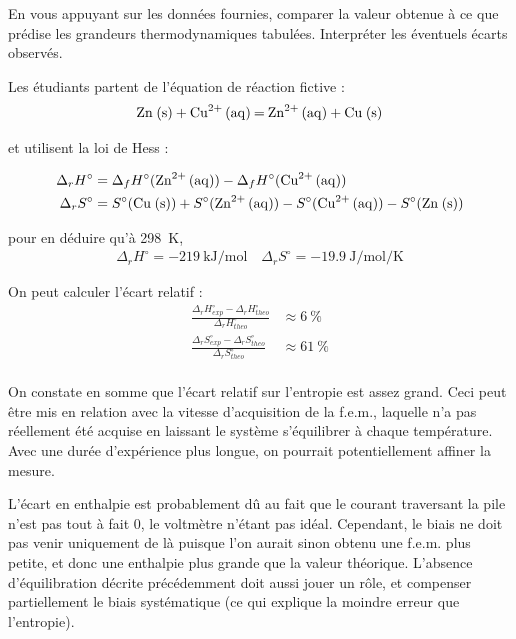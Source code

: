 \documentclass[twoside,a4paper,11pt,addpoints]{exam}%
\newcounter{foo} %
\begin{document}
\begin{questions}
\begin{mybox}
\bonusquestion[1] En vous appuyant sur les données fournies, comparer la valeur obtenue à ce que prédise les grandeurs thermodynamiques tabulées. Interpréter les éventuels écarts observés.


\begin{solution}[8cm]
Les étudiants partent de l'équation de réaction fictive : 
\begin{align*}
\ce{Zn (s) +  Cu^{2+} (aq) = Zn^{2+} (aq) + Cu (s)}
\end{align*}

et utilisent la loi de Hess : 

\begin{align*}
\Delta_r H^\circ &= \Delta_f H^\circ ( \ce{Zn^{2+} (aq)} ) - \Delta_f H^\circ ( \ce{Cu^{2+} (aq)} ) \\
\Delta_r S^\circ &= S^\circ ( \ce{Cu (s)} ) + S^\circ ( \ce{Zn^{2+} (aq)} ) - S^\circ ( \ce{Cu^{2+} (aq)} ) - S^\circ ( \ce{Zn (s)} ) 
\end{align*}

pour en déduire qu'à \SI{298}{\kelvin}, 
\begin{align*}
\Delta_r H^\circ = - 219 ~ \si{\kilo\joule\per\mole} \quad \Delta_r S^\circ = -19.9 ~ \si{\joule\per\mole\per\kelvin}
\end{align*}

On peut calculer l'écart relatif :
\begin{align}
\frac{\Delta_r H^\circ_{exp} - \Delta_r H^\circ_{theo}}{\Delta_r H^\circ_{theo}} &\approx 6 ~ \si{\percent} \\
\frac{\Delta_r S^\circ_{exp} - \Delta_r S^\circ_{theo}}{\Delta_r S^\circ_{theo}} &\approx 61 ~ \si{\percent} \\
\end{align}

On constate en somme que l'écart relatif sur l'entropie est assez grand. Ceci peut être mis en relation avec la vitesse d'acquisition de la f.e.m., laquelle n'a pas réellement été acquise en laissant le système s'équilibrer à chaque température. Avec une durée d'expérience plus longue, on pourrait potentiellement affiner la mesure.

L'écart en enthalpie est probablement dû au fait que le courant traversant la pile n'est pas tout à fait $0$, le voltmètre n'étant pas idéal. Cependant, le biais ne doit pas venir uniquement de là puisque l'on aurait sinon obtenu une f.e.m. plus petite, et donc une enthalpie plus grande que la valeur théorique. L'absence d'équilibration décrite précédemment doit aussi jouer un rôle, et compenser partiellement le biais systématique (ce qui explique la moindre erreur que l'entropie).
\end{solution}
\end{mybox}
\setcounter{foo}{\value{question}}
\end{questions}
\end{document}
